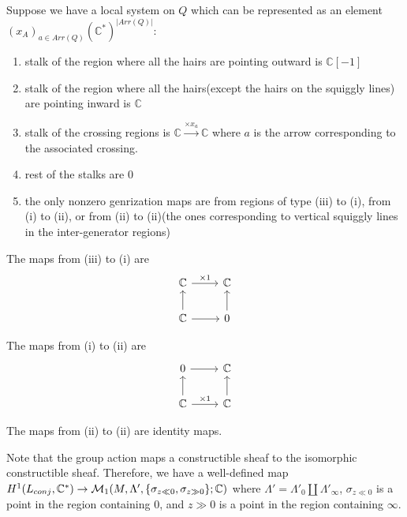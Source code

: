 \begin{definition}
Suppose we have a local system on $Q$ which can be represented as an element $(x_A)_{a\in Arr(Q)}(\mathbb{C}^*)^{|Arr(Q)|}$:

\begin{enumerate}[label= (\roman*)]
\item stalk of the region where all the hairs are pointing outward is $\mathbb{C}[-1]$

\item stalk of the region where all the hairs(except the hairs on the squiggly lines) are pointing inward is $\mathbb{C}$

\item stalk of the crossing regions is $\mathbb{C}\xrightarrow{\times x_a}\mathbb{C}$ where $a$ is the arrow corresponding to the associated crossing.

\item rest of the stalks are $0$

\item the only nonzero genrization maps are from regions of type (\Rn{3}) to (\Rn{1}), from (\Rn{1}) to (\Rn{2}), or from (\Rn{2}) to (\Rn{2})(the ones corresponding to vertical squiggly lines in the inter-generator regions)
\end{enumerate}

The maps from (\Rn{3}) to (\Rn{1}) are
\[
  \begin{tikzcd}
    \mathbb{C} \arrow{r}{\times 1} & \mathbb{C} \\
    \mathbb{C}\arrow{u}{} \arrow{r}{}& 0\arrow{u}{}
  \end{tikzcd}
\]

The maps from (\Rn{1}) to (\Rn{2}) are
\[
  \begin{tikzcd}
	0 \arrow{r}{} & \mathbb{C} \\
    \mathbb{C}\arrow{u}{} \arrow{r}{\times 1}& \mathbb{C}\arrow{u}{}
  \end{tikzcd}
\]

The maps from (\Rn{2}) to (\Rn{2}) are identity maps.
\end{definition}

Note that the group action maps a constructible sheaf to the isomorphic constructible sheaf. Therefore, we have a well-defined map
$H^1(L_{conj},\mathbb{C}^*)\rightarrow \mathcal{M}_1(M,\Lambda',\{\sigma_{z\ll 0},\sigma_{z\gg 0}\};\mathbb{C})$ where $\Lambda' = \Lambda'_0 \coprod \Lambda'_\infty$, $\sigma_{z\ll 0}$ is a point in the region containing $0$, and $z\gg 0$ is a point in the region containing $\infty$.